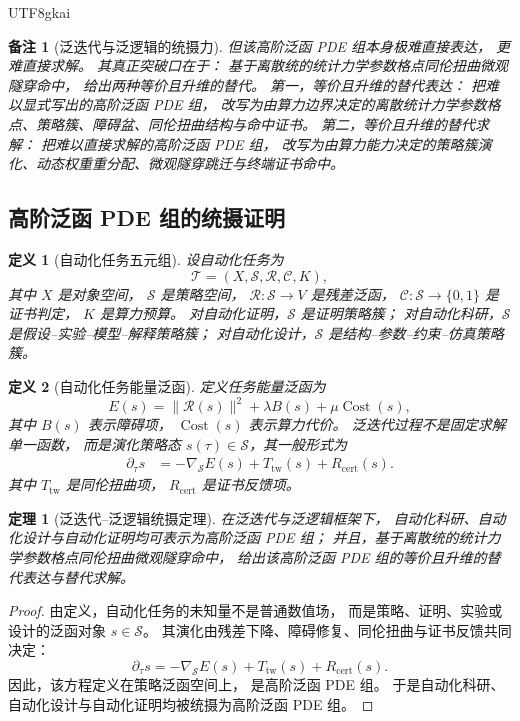 \documentclass[12pt]{article}
\newtheorem{definition}{定义}[section]
\newtheorem{theorem}{定理}[section]
\newtheorem{remark}{备注}[section]
\newcommand{\Cost}{\operatorname{Cost}}
\begin{document}
\begin{CJK*}{UTF8}{gkai}
\begin{remark}[泛迭代与泛逻辑的统摄力]
但该高阶泛函 PDE 组本身极难直接表达，
更难直接求解。
其真正突破口在于：
基于离散统的统计力学参数格点同伦扭曲微观隧穿命中，
给出两种等价且升维的替代。
第一，等价且升维的替代表达：
把难以显式写出的高阶泛函 PDE 组，
改写为由算力边界决定的离散统计力学参数格点、策略簇、障碍盆、同伦扭曲结构与命中证书。
第二，等价且升维的替代求解：
把难以直接求解的高阶泛函 PDE 组，
改写为由算力能力决定的策略簇演化、动态权重重分配、微观隧穿跳迁与终端证书命中。
\end{remark}

\subsection{高阶泛函 PDE 组的统摄证明}
\label{subsec:tex53-pan-hf-proof}

\begin{definition}[自动化任务五元组]
设自动化任务为
\[
  \mathcal T
  =
  (X,\mathcal S,\mathcal R,\mathcal C,K),
\]
其中 \(X\) 是对象空间，
\(\mathcal S\) 是策略空间，
\(\mathcal R:\mathcal S\to V\) 是残差泛函，
\(\mathcal C:\mathcal S\to\{0,1\}\) 是证书判定，
\(K\) 是算力预算。
对自动化证明，\(\mathcal S\) 是证明策略簇；
对自动化科研，\(\mathcal S\) 是假设--实验--模型--解释策略簇；
对自动化设计，\(\mathcal S\) 是结构--参数--约束--仿真策略簇。
\end{definition}

\begin{definition}[自动化任务能量泛函]
定义任务能量泛函为
\[
  E(s)
  =
  \|\mathcal R(s)\|^2
  +
  \lambda B(s)
  +
  \mu \Cost(s),
\]
其中 \(B(s)\) 表示障碍项，
\(\Cost(s)\) 表示算力代价。
泛迭代过程不是固定求解单一函数，
而是演化策略态 \(s(\tau)\in\mathcal S\)，其一般形式为
\[
\begin{aligned}
  \partial_\tau s
  &=
  -\nabla_{\mathcal S}E(s)
  +
  T_{\mathrm{tw}}(s)
  +
  R_{\mathrm{cert}}(s).
\end{aligned}
\]
其中 \(T_{\mathrm{tw}}\) 是同伦扭曲项，
\(R_{\mathrm{cert}}\) 是证书反馈项。
\end{definition}

\begin{theorem}[泛迭代--泛逻辑统摄定理]
\label{thm:tex53-pan-hf}
在泛迭代与泛逻辑框架下，
自动化科研、自动化设计与自动化证明均可表示为高阶泛函 PDE 组；
并且，基于离散统的统计力学参数格点同伦扭曲微观隧穿命中，
给出该高阶泛函 PDE 组的等价且升维的替代表达与替代求解。
\end{theorem}

\begin{proof}
由定义，自动化任务的未知量不是普通数值场，
而是策略、证明、实验或设计的泛函对象 \(s\in\mathcal S\)。
其演化由残差下降、障碍修复、同伦扭曲与证书反馈共同决定：
\[
  \partial_\tau s
  =
  -\nabla_{\mathcal S}E(s)
  +
  T_{\mathrm{tw}}(s)
  +
  R_{\mathrm{cert}}(s).
\]
因此，该方程定义在策略泛函空间上，
是高阶泛函 PDE 组。
于是自动化科研、自动化设计与自动化证明均被统摄为高阶泛函 PDE 组。


\end{proof}
\end{CJK*}
\end{document}
